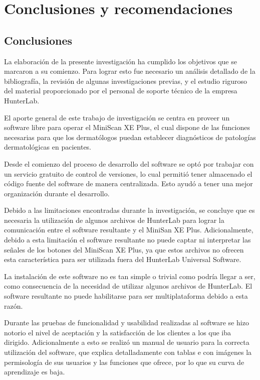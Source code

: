 \chapter{Conclusiones y recomendaciones}

\capV

\section{Conclusiones}

	La elaboraci\'{o}n de la presente investigaci\'{o}n ha cumplido los objetivos que se marcaron a su comienzo. Para lograr esto fue necesario un an\'{a}lisis detallado de la bibliograf\'{i}a, la revisi\'{o}n de algunas investigaciones previas, y el estudio riguroso del material proporcionado por el personal de soporte t\'{e}cnico de la empresa HunterLab.
	
	El aporte general de este trabajo de investigaci\'{o}n se centra en proveer un software libre para operar el MiniScan XE Plus, el cual dispone de las funciones necesarias para que los dermat\'{o}logos puedan establecer diagn\'{o}sticos de patolog\'{i}as dermatol\'{o}gicas en pacientes.
	
	Desde el comienzo del proceso de desarrollo del software se opt\'{o} por trabajar con un servicio gratuito de control de versiones, lo cual permiti\'{o} tener almacenado el c\'{o}digo fuente del software de manera centralizada. Esto ayud\'{o} a tener una mejor organizaci\'{o}n durante el desarrollo.
	
	Debido a las limitaciones encontradas durante la investigaci\'{o}n, se concluye que es necesaria la utilizaci\'{o}n de algunos archivos de HunterLab para lograr la comunicaci\'{o}n entre el software resultante y el MiniSan XE Plus. Adicionalmente, debido a esta limitaci\'{o}n el software resultante no puede captar ni interpretar las se\~{n}ales de los botones del MiniScan XE Plus, ya que estos archivos no ofrecen esta caracter\'{i}stica para ser utilizada fuera del HunterLab Universal Software.
	
	La instalaci\'{o}n de este software no es tan simple o trivial como podr\'{i}a llegar a ser, como consecuencia de la necesidad de utilizar algunos archivos de HunterLab. El software resultante no puede habilitarse para ser multiplataforma debido a esta raz\'{o}n.

	Durante las pruebas de funcionalidad y usabilidad realizadas al software se hizo notorio el nivel de aceptaci\'{o}n y la satisfacci\'{o}n de los clientes a los que iba dirigido. Adicionalmente a esto se realiz\'{o} un manual de usuario para la correcta utilizaci\'{o}n del software, que explica detalladamente con tablas e con im\'{a}genes la permisolog\'{i}a de sus usuarios y las funciones que ofrece, por lo que su curva de aprendizaje es baja.

